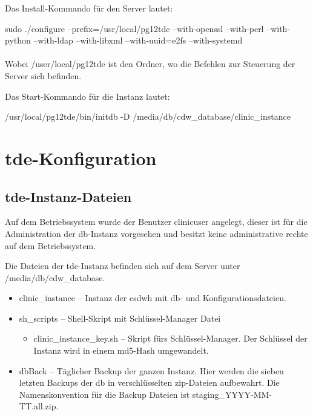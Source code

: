     Das Install-Kommando für den Server lautet: 
           
    sudo ./configure --prefix=/usr/local/pg12tde --with-openssl --with-perl --with-python --with-ldap --with-libxml --with-uuid=e2fs --with-systemd\\ \\
    
    Wobei /user/local/pg12tde ist den Ordner, wo die Befehlen zur Steuerung der Server sich befinden.
    
    Das Start-Kommando für die Instanz lautet: 
    
    /usr/local/pg12tde/bin/initdb -D /media/db/cdw\_database/clinic\_instance
    

	\section{\acs{tde}-Konfiguration} 
	
    \subsection{\acs{tde}-Instanz-Dateien}
    Auf dem Betriebssystem wurde der Benutzer \textsf{clinicuser} angelegt, dieser ist für die Administration der \ac{db}-Instanz vorgesehen und besitzt keine administrative rechte auf dem Betriebssystem.
    
    Die Dateien der \ac{tde}-Instanz befinden sich auf dem Server unter \textsf{/media/db/cdw\_database}.
    \begin{itemize}
    	\item \textsf{clinic\_instance} -- Instanz der \ac{csdwh} mit \ac{db}- und Konfigurationsdateien.
    	\item \textsf{sh\_scripts} -- Shell-Skript mit Schlüssel-Manager Datei
    	\begin{itemize}
           \item \textsf{clinic\_instance\_key.sh} -- Skript fürs Schlüssel-Manager. Der Schlüssel der Instanz wird in einem \ac{md5}-Hash umgewandelt.
    	\end{itemize}
    	\item \textsf{dbBack} -- Täglicher Backup der ganzen Instanz. Hier werden die sieben letzten Backups der \ac{db} in verschlüsselten \ac{zip}-Dateien aufbewahrt. Die Namenskonvention für die Backup Dateien ist \textsf{staging\_YYYY-MM-TT.all.zip}.
    \end{itemize}

